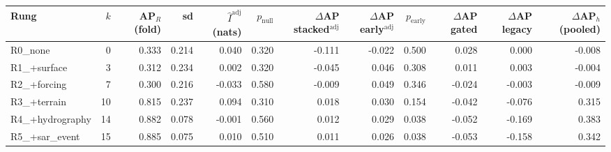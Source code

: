 \begin{tabular}{lrrrrrrrrrrr}
\toprule
Rung & $k$ & AP$_R$ (fold) & sd & $\hat I^{\mathrm{adj}}$ (nats) & $p_{\mathrm{null}}$ & $\Delta$AP stacked$^{\mathrm{adj}}$ & $\Delta$AP early$^{\mathrm{adj}}$ & $p_{\mathrm{early}}$ & $\Delta$AP gated & $\Delta$AP legacy & $\Delta$AP$_h$ (pooled) \\
\midrule
R0\_none & 0 & 0.333 & 0.214 & 0.040 & 0.320 & -0.111 & -0.022 & 0.500 & 0.028 & 0.000 & -0.008 \\
R1\_+surface & 3 & 0.312 & 0.234 & 0.002 & 0.320 & -0.045 & 0.046 & 0.308 & 0.011 & 0.003 & -0.004 \\
R2\_+forcing & 7 & 0.300 & 0.216 & -0.033 & 0.580 & -0.009 & 0.049 & 0.346 & -0.024 & -0.003 & -0.009 \\
R3\_+terrain & 10 & 0.815 & 0.237 & 0.094 & 0.310 & 0.018 & 0.030 & 0.154 & -0.042 & -0.076 & 0.315 \\
R4\_+hydrography & 14 & 0.882 & 0.078 & -0.001 & 0.560 & 0.012 & 0.029 & 0.038 & -0.052 & -0.169 & 0.383 \\
R5\_+sar\_event & 15 & 0.885 & 0.075 & 0.010 & 0.510 & 0.011 & 0.026 & 0.038 & -0.053 & -0.158 & 0.342 \\
\bottomrule
\end{tabular}
